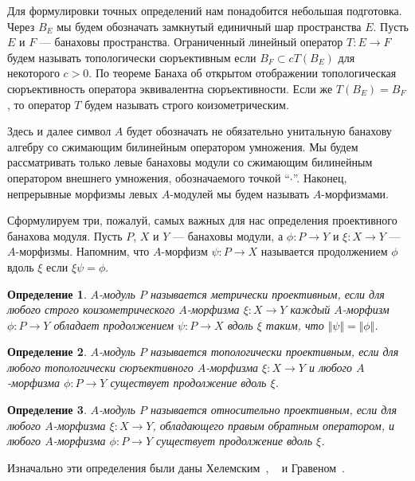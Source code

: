 \documentclass[12pt]{article}
\numberwithin{equation}{subsection}
\theoremstyle{plain}
\newtheorem{definition}{Определение}
\begin{document}
\begin{fulltext}
Для формулировки точных определений нам понадобится небольшая подготовка. Через
$B_E$ мы будем обозначать замкнутый единичный шар пространства $E$. Пусть $E$ и
$F$ --- банаховы пространства. Ограниченный линейный оператор $T:E\to F$ будем
называть топологически сюръективным если $B_F\subset cT(B_E)$ для некоторого
$c>0$. По теореме Банаха об открытом отображении топологическая сюръективность
оператора эквивалентна сюръективности. Если же $T(B_E)=B_F$, то оператор $T$
будем называть строго коизометрическим. 

Здесь и далее символ $A$ будет обозначать не обязательно унитальную банахову
алгебру со сжимающим билинейным оператором умножения. Мы будем рассматривать
только левые банаховы модули со сжимающим билинейным оператором внешнего
умножения, обозначаемого точкой ``$\cdot$''. Наконец, непрерывные морфизмы левых
$A$-модулей мы будем называть $A$-морфизмами.

Сформулируем три, пожалуй, самых важных для нас определения проективного
банахова модуля. Пусть $P$, $X$ и $Y$ --- банаховы модули, а $\phi:P\to Y$ и
$\xi:X\to Y$ --- $A$-морфизмы. Напомним, что $A$-морфизм $\psi:P\to X$
называется продолжением $\phi$ вдоль $\xi$ если $\xi\psi=\phi$. 

\begin{definition}\label{MetProjMod} $A$-модуль $P$ называется метрически
проективным, если для любого строго коизометрического $A$-морфизма $\xi:X\to Y$
каждый $A$-морфизм $\phi:P\to Y$ обладает продолжением $\psi:P\to X$ вдоль $\xi$
таким, что $\Vert\psi\Vert=\Vert\phi\Vert$.
\end{definition}

\begin{definition}\label{TopProjMod} $A$-модуль $P$ называется топологически
проективным, если для любого топологически сюръективного $A$-морфизма $\xi:X\to
Y$ и любого\newline 
$A$-морфизма $\phi:P\to Y$ существует продолжение вдоль $\xi$.
\end{definition}

\begin{definition}\label{RelProjMod} $A$-модуль $P$ называется относительно
проективным, если \newline для любого $A$-морфизма $\xi:X\to Y$, обладающего
правым обратным оператором, и любого $A$-морфизма $\phi:P\to Y$ существует
продолжение вдоль $\xi$.
\end{definition}

Изначально эти определения были даны Хелемским~\cite{HelemHomolDimNorModBanAlg},
~\cite{HelMetrFrQMod} и Гравеном~\cite{GravInjProjBanMod}.


\end{fulltext}
\end{document}
